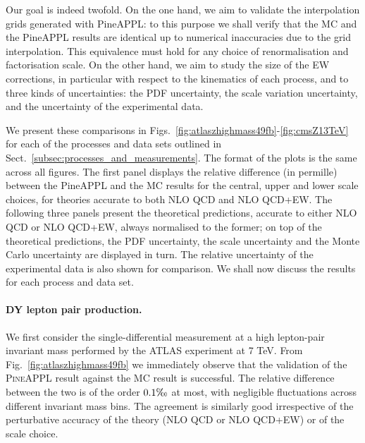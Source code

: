Our goal is indeed twofold. On the one hand, we aim to validate the
interpolation grids generated with {\sc PineAPPL}: to this purpose we shall
verify that the MC and the {\sc PineAPPL} results are identical up to numerical
inaccuracies due to the grid interpolation. This equivalence must hold for any
choice of renormalisation and factorisation scale. On the other hand, we aim to
study the size of the EW corrections, in particular with respect to the
kinematics of each process, and to three kinds of uncertainties: the PDF
uncertainty, the scale variation uncertainty, and the uncertainty of the
experimental data.

We present these comparisons in
Figs.~\ref{fig:atlaszhighmass49fb}-\ref{fig:cmsZ13TeV} for each of the processes
and data sets outlined in Sect.~\ref{subsec:processes_and_measurements}.
The format of the plots is the same across all figures. The first panel
displays the relative difference (in permille) between the {\sc PineAPPL} and
the {\sc MC} results for the central, upper and lower scale choices, for
theories accurate to both NLO QCD and NLO QCD+EW. The following three panels
present the theoretical predictions, accurate to either NLO QCD or NLO QCD+EW,
always normalised to the former; on top of the theoretical predictions, the
PDF uncertainty, the scale uncertainty and the Monte Carlo uncertainty are
displayed in turn. The relative uncertainty of the experimental data is
also shown for comparison. We shall now discuss the results for each
process and data set.

\paragraph{DY lepton pair production.} 

We first consider the single-differential measurement at a high lepton-pair
invariant mass performed by the ATLAS experiment at 7 TeV. 
From Fig.~\ref{fig:atlaszhighmass49fb} we immediately
observe that the validation of the \textsc{PineAPPL} result against the MC
result is successful. The relative difference between the two is of the order
$0.1\tcperthousand$ at most, with negligible fluctuations across different
invariant mass bins. The agreement is similarly good irrespective of the
perturbative accuracy of the theory (NLO QCD or NLO QCD+EW) or of the scale
choice.

